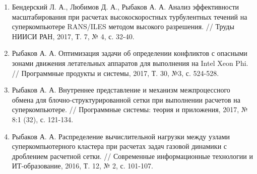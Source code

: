 \documentclass[a4paper,14pt]{extarticle}                     %
\theoremstyle{plain}                                         %
\begin{document}
\begin{enumerate}[noitemsep,topsep=0pt,parsep=0pt,partopsep=0pt]
\item Бендерский Л. А., Любимов Д. А., Рыбаков А. А. Анализ эффективности масштабирования при расчетах высокоскоростных турбулентных течений на суперкомпьютере RANS/ILES методом высокого разрешения. // Труды НИИСИ РАН, 2017, Т. 7, № 4, с. 32-40.
\item Рыбаков А. А. Оптимизация задачи об определении конфликтов с опасными зонами движения летательных аппаратов для выполнения на Intel Xeon Phi. // Программные продукты и системы, 2017, Т. 30, №3, с. 524-528.
\item Рыбаков А. А. Внутреннее представление и механизм межпроцессного обмена для блочно-структурированной сетки при выполнении расчетов на суперкомпьютере. // Программные системы: теория и приложения, 2017, № 8:1 (32), с. 121-134.
\item Рыбаков А. А. Распределение вычислительной нагрузки между узлами суперкомпьютерного кластера при расчетах задач газовой динамики с дроблением расчетной сетки. // Современные информационные технологии и ИТ-образование, 2016, Т. 12, № 2, с. 101-107.
\end{enumerate}
\end{document}
